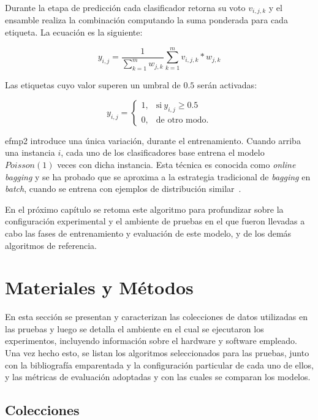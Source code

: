 Durante la etapa de predicción cada clasificador retorna su voto $v_{i,j,k}$ y
el ensamble realiza la combinación computando la suma ponderada para cada
etiqueta. La ecuación es la siguiente:

\begin{equation}
	y_{i,j} = \frac{1}{\sum_{k=1}^{m} w_{j,k}} \sum_{k=1}^{m} v_{i,j,k} *
	w_{j,k}
\end{equation}

Las etiquetas cuyo valor superen un umbral de $0.5$ serán activadas:

\begin{equation}
	y_{i,j} =
	\begin{cases}
		1, & \text{si}\ y_{i,j} \geq 0.5 \\
		0, & \text{de otro modo.}
	\end{cases}
\end{equation}

\acrshort{efmp2} introduce una única variación, durante el entrenamiento. Cuando
arriba una instancia $i$, cada uno de los clasificadores base entrena el modelo
$Poisson(1)$ veces con dicha instancia. Esta técnica es conocida como
\textit{online bagging} y se ha probado que se aproxima a la estrategia
tradicional de \textit{bagging} en \textit{batch}, cuando se entrena con
ejemplos de distribución similar~\cite{oza_online_2005}.

En el próximo capítulo se retoma este algoritmo para profundizar sobre la
configuración experimental y el ambiente de pruebas en el que fueron llevadas a
cabo las fases de entrenamiento y evaluación de este modelo, y de los demás
algoritmos de referencia.

\section{Materiales y Métodos}
\label{materiales_y_metodos}

En esta sección se presentan y caracterizan las colecciones de datos utilizadas
en las pruebas y luego se detalla el ambiente en el cual se ejecutaron los
experimentos, incluyendo información sobre el hardware y software empleado. Una
vez hecho esto, se listan los algoritmos seleccionados para las pruebas, junto
con la bibliografía emparentada y la configuración particular de cada uno de
ellos, y las métricas de evaluación adoptadas y con las cuales se comparan los
modelos.

\subsection{Colecciones}

